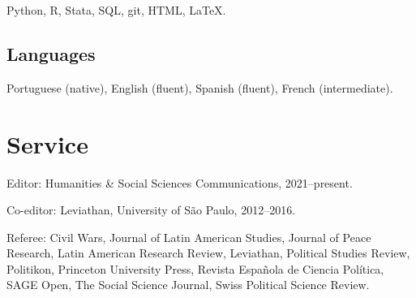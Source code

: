 \documentclass[a4paper]{article}
\renewenvironment{itemize}{
	\begin{list}{}{
			\setlength{\leftmargin}{1.5em}
		}
		}{
	\end{list}
}
\begin{document}
\begin{itemize}
\item Python, R, Stata, SQL, git, HTML, \LaTeX{}.
\end{itemize}

\subsection*{Languages}

\begin{itemize}
\item Portuguese (native), English (fluent), Spanish (fluent), French (intermediate).
\end{itemize}



\section*{Service}

\begin{itemize}
\item Editor: Humanities \& Social Sciences Communications, 2021--present.
\item Co-editor: Leviathan, University of São Paulo, 2012--2016.
\item Referee: Civil Wars, Journal of Latin American Studies, Journal of Peace Research, Latin American Research Review, Leviathan, Political Studies Review, Politikon, Princeton University Press, Revista Española de Ciencia Política, SAGE Open, The Social Science Journal, Swiss Political Science Review.
\end{itemize}
\end{document}
